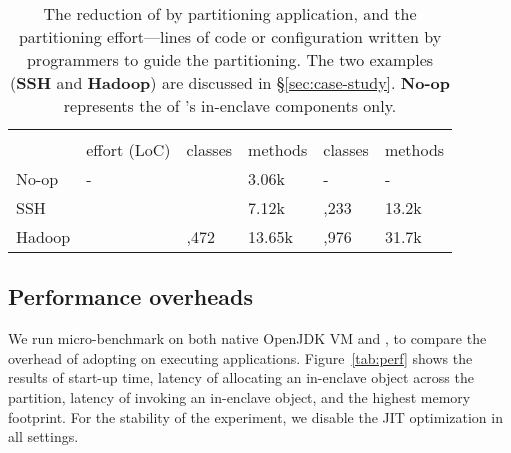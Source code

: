 \begin{table}[t!b!]
\caption{The reduction of \tcbsize{} by partitioning application, and the partitioning effort---lines of code or configuration written by programmers to guide the partitioning.
The two examples ({\bf SSH} and {\bf Hadoop}) are discussed in \S\ref{sec:case-study}.	 %
{\bf No-op} represents the \tcbsize{} of \sysname{}'s in-enclave components only.}
\small
\centering
\tabcolsep=5pt
\begin{tabular}{>{\centering\arraybackslash}p{0.4in}>{\raggedleft\arraybackslash}p{0.4in}>{\raggedleft\arraybackslash}p{0.45in}>{\raggedleft\arraybackslash}p{0.5in}>{\raggedleft\arraybackslash}p{0.45in}>{\raggedleft\arraybackslash}p{0.5in}}
\hline
\addlinespace[2pt]
{\bf App} & \multicolumn{3}{c}{{\bf Partitioned with \sysname{}}} & \multicolumn{2}{c}{{\bf Non-partitioned}}  \\
 & effort (LoC) & classes & methods & classes & methods \\
No-op   &   - &   544 & 3.06k & - & - \\
SSH     &  18 &   972 & 7.12k & 1,233 & 13.2k \\
Hadoop  & 800 & 2,472 & 13.65k & 2,976 & 31.7k \\
\hline
\end{tabular}
\label{tab:case-tcb}
\end{table}


\subsection{Performance overheads}
\label{sec:eval:microbench}

We run micro-benchmark on both native OpenJDK VM and \sysname{}, to compare the overhead of adopting \sysname{} on executing \java{} applications.
Figure~\ref{tab:perf} shows the results of start-up time, latency of allocating an in-enclave object across the partition, 
latency of invoking an in-enclave object, and the highest memory footprint.
For the stability of the experiment, we disable the \java{} JIT optimization in all settings.


